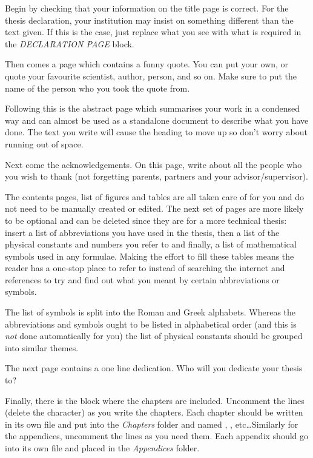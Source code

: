Begin by checking that your information on the title page is correct.
For the thesis declaration, your institution may insist on something different than the text given. If this is the case, just replace what you see with what is required in the \emph{DECLARATION PAGE} block.

Then comes a page which contains a funny quote.
You can put your own, or quote your favourite scientist, author, person, and so on. Make sure to put the name of the person who you took the quote from.

Following this is the abstract page which summarises your work in a condensed way and can almost be used as a standalone document to describe what you have done. The text you write will cause the heading to move up so don't worry about running out of space.

Next come the acknowledgements.
On this page, write about all the people who you wish to thank (not forgetting parents, partners and your advisor/supervisor).

The contents pages, list of figures and tables are all taken care of for you and do not need to be manually created or edited.
The next set of pages are more likely to be optional and can be deleted since they are for a more technical thesis: insert a list of abbreviations you have used in the thesis, then a list of the physical constants and numbers you refer to and finally, a list of mathematical symbols used in any formulae.
Making the effort to fill these tables means the reader has a one-stop place to refer to instead of searching the internet and references to try and find out what you meant by certain abbreviations or symbols.

The list of symbols is split into the Roman and Greek alphabets.
Whereas the abbreviations and symbols ought to be listed in alphabetical order (and this is \emph{not} done automatically for you) the list of physical constants should be grouped into similar themes.

The next page contains a one line dedication.
Who will you dedicate your thesis to?

Finally, there is the block where the chapters are included.
Uncomment the lines (delete the \code{\%} character) as you write the chapters.
Each chapter should be written in its own file and put into the \emph{Chapters} folder and named , , etc\ldots Similarly for the appendices, uncomment the lines as you need them.
Each appendix should go into its own file and placed in the \emph{Appendices} folder.

